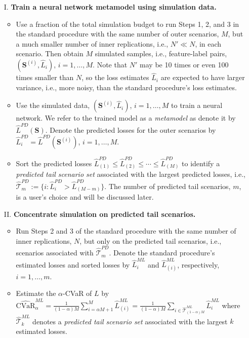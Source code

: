 \documentclass[]{article}
\newcommand{\CVaR}{\mbox{CVaR}}
\newcommand{\tail}{\mathcal{T}}
\newcommand{\bS}{\bm{S}}
\newcommand{\Lhat}{\widehat{L}}
\begin{document}
\begin{itemize}
    \item[I.] \textbf{Train a neural network metamodel using simulation data.}
    \begin{itemize}[leftmargin=0pt]
        \item Use a fraction of the total simulation budget to run Steps 1, 2, and 3 in the standard procedure with the same number of outer scenarios, $M$, but a much smaller number of inner replications, i.e., $N'\ll N$, in each scenario.
        Then obtain $M$ simulated samples, i.e., feature-label pairs, $(\bS^{(i)}, \Lhat_i)$, $i=1,\ldots,M$.
        Note that $N'$ may be 10 times or even 100 times smaller than $N$, so the loss estimates $\Lhat_i$ are expected to have larger variance, i.e., more noisy, than the standard procedure's loss estimates.
    
        \item Use the simulated data, $(\bS^{(i)}, \Lhat_i)$, $i=1,\ldots,M$ to train a neural network.
        We refer to the trained model as a \textit{metamodel} as denote it by $\Lhat^{PD}(\bS)$.
        Denote the predicted losses for the outer scenarios by $\Lhat^{PD}_i = \Lhat^{PD}(\bS^{(i)})$, $i=1,\ldots,M$.
    
        \item Sort the predicted losses $\Lhat^{PD}_{(1)}\leq \Lhat^{PD}_{(2)} \leq \cdots\leq \Lhat^{PD}_{(M)}$ to identify a \textit{predicted tail scenario set} associated with the largest predicted losses, i.e., $\widehat{\tail}_{m}^{PD}:=\{i: \Lhat^{PD}_i > \Lhat^{PD}_{(M-m)}\}$.
        The number of predicted tail scenarios, $m$, is a user's choice and will be discussed later.
    \end{itemize}
        \item[II.] \textbf{Concentrate simulation on predicted tail scenarios.}
        \begin{itemize}[leftmargin=0pt]
        
        \item Run Steps 2 and 3 of the standard procedure with the same number of inner replications, $N$, but only on the predicted tail scenarios, i.e., scenarios associated with $\widehat{\tail}_{m}^{PD}$.
        Denote the standard procedure's estimated losses and sorted losses by $\Lhat^{ML}_i$ and $\Lhat^{ML}_{(i)}$, respectively, $i=1,\ldots,m$.
        
        \item Estimate the $\alpha$-CVaR of $L$ by $\widehat{\CVaR}^{ML}_\alpha = \frac{1}{(1-\alpha)M} \sum_{i=\alpha M + 1}^{M}\Lhat_{(i)}^{ML} = \frac{1}{(1-\alpha)M} \sum_{i \in \widehat{\tail}_{(1-\alpha )M}^{ML}}\Lhat_{i}^{ML}$
        where $\widehat{\tail}_{k}^{ML}$ denotes a \textit{predicted tail scenario set} associated with the largest $k$ estimated losses.
    \end{itemize}
    \end{itemize}
    
\end{document}
